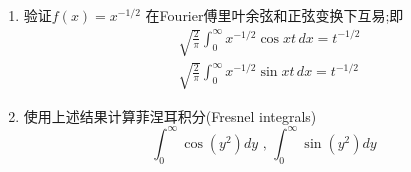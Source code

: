 \documentclass[10pt]{article}
\newenvironment{problem}[2][]{\begin{trivlist}
\item[\hskip \labelsep {\bfseries #1}\hskip \labelsep {\bfseries #2}]}{\end{trivlist}}
\begin{document}
\begin{problem}{6.5}
  \begin{enumerate}
  \item 验证$f(x)=x^{-1 / 2}$ 在Fourier傅里叶余弦和正弦变换下互易;即
  $$
  \begin{aligned}
  & \sqrt{\frac{2}{\pi}} \int_0^{\infty} x^{-1 / 2} \cos {x t} \, dx=t^{-1 / 2} \\
  & \sqrt{\frac{2}{\pi}} \int_0^{\infty} x^{-1 / 2} \sin {x t} \, dx=t^{-1 / 2}
  \end{aligned}
  $$
  \item 使用上述结果计算菲涅耳积分(Fresnel integrals)
  $$
  \int_0^{\infty} \cos \left(y^2\right) d y \text { , } \int_0^{\infty} \sin \left(y^2\right) d y
  $$
\end{enumerate}

\end{problem}
\end{document}
